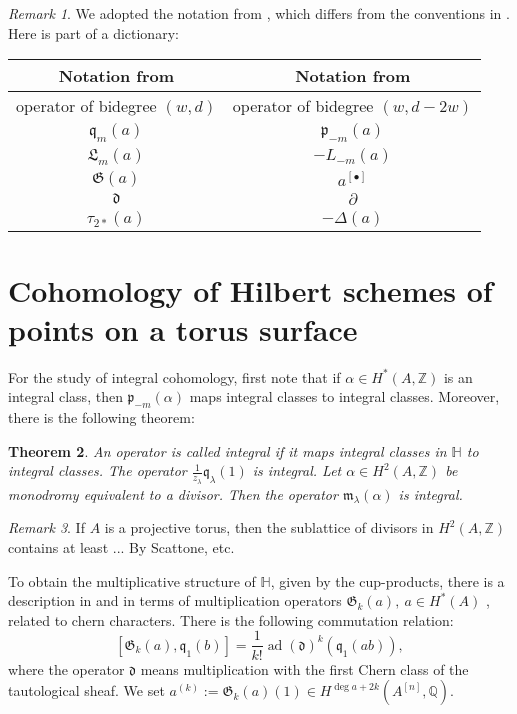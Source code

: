 \documentclass{amsart}
\DeclareMathOperator{\ad}{ad}
\newcommand{\hilb}[1]{^{[#1]}}
\newcommand{\vac}{|0\rangle}
\newcommand{\p}{\mathfrak{p}}
\newcommand{\q}{\mathfrak{q}}
\renewcommand{\H}{\mathbb{H}}
\newcommand{\Q}{\mathbb{Q}}
\newcommand{\Z}{\mathbb{Z}}
\newcommand{\kq}{\mathfrak{q}}
\theoremstyle{plain}
\newtheorem{theorem}{Theorem}[section]
\theoremstyle{definition}
\theoremstyle{remark}
\newtheorem{remark}[theorem]{Remark}
\begin{document}
\begin{remark}
We adopted the notation from \cite{LiQinWang}, which differs from the conventions in \cite{LehnSorger}. Here is part of a dictionary:

\begin{tabular}{c|c} 
Notation from \cite{LiQinWang} & Notation from \cite{LehnSorger} \\\hline
operator of bidegree $(w,d)$ & operator of bidegree $(w,d-2w)$\\
$\q_m(a) $ & $\p_{-m}(a)$ \\
$ \mathfrak{L}_m(a) $ & $ - L_{-m}(a)$ \\
$\mathfrak{G}(a)$ & $a\hilb{\bullet}$\\
$ \mathfrak{d} $ & $ \partial $ \\
$\tau_{2*}(a)$& $-\Delta(a)$
\end{tabular}


\end{remark}


\section{Cohomology of Hilbert schemes of points on a torus surface}

For the study of integral cohomology, first note that if $\alpha \in H^*(A,\Z)$ is an integral class, then $\p_{-m}(\alpha) $ maps integral classes to integral classes. 
Moreover, there is the following theorem:
\begin{theorem} \cite{QinWang}
An operator is called integral if it maps integral classes in $\H$ to integral classes. The operator $\frac{1}{z_\lambda}\kq_{\lambda}(1)$ is integral. Let $\alpha \in H^2(A,\Z)$ be monodromy equivalent to a divisor. Then the operator $\mathfrak{m}_{\lambda}(\alpha)$ is integral.
\end{theorem}
\begin{remark}
If $A$ is a projective torus, then the sublattice of divisors in $H^2(A,\Z)$ contains at least ... By Scattone, etc.
\end{remark}


To obtain the multiplicative structure of $\H$, given by the cup-products, there is a description in \cite{LehnSorger} and \cite{LiQinWang} in terms of multiplication operators $\mathfrak{G}_k(a),\ a\in H^*(A)$ \cite[Def.~5.1]{LiQinWang}, related to chern characters. There is the following commutation relation: 
$$
[\mathfrak{G}_k(a),\kq_1(b)] = \frac{1}{k!}\ad(\mathfrak{d})^k(\kq_1(ab)),
$$
where the operator $\mathfrak{d}$ means multiplication with the first Chern class of the tautological sheaf.
We set $a^{(k)} := \mathfrak{G}_k(a) (1) \in H^{\deg a + 2k}(A\hilb{n},\Q)$.
\end{document}
